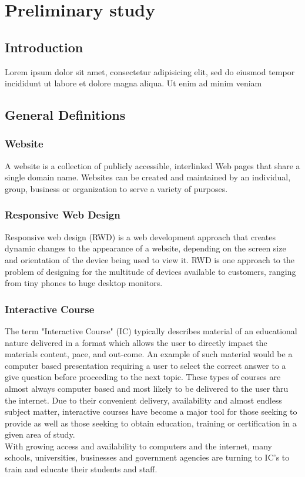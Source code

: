 \chapter{Preliminary study}

\section{Introduction}
Lorem ipsum dolor sit amet, consectetur adipisicing elit, sed do eiusmod
tempor incididunt ut labore et dolore magna aliqua. Ut enim ad minim veniam


\section{General Definitions}
\subsection{Website}
A website is a collection of publicly accessible, interlinked Web pages that share 
a single domain name. Websites can be created and maintained by an individual, group, 
business or organization to serve a variety of purposes.\cite{Techopedia2011-zo}

\subsection{Responsive Web Design}
Responsive web design (RWD) is a web development approach that creates dynamic 
changes to the appearance of a website, depending on the screen size and orientation of 
the device being used to view it. RWD is one approach to the problem of designing for 
the multitude of devices available to customers, ranging from tiny phones to huge desktop monitors.\cite{noauthor_undated-an}

\subsection{Interactive Course}
The term "Interactive Course" (IC) typically describes material of an educational nature 
delivered in a format which allows the user to directly impact the materials content, pace, and out-come.
An example of such material would be a computer based presentation requiring a user to select the correct 
answer to a give question before proceeding to the next topic.
These types of courses are almost always computer based and most likely to be delivered to the user thru the internet. 
Due to their convenient delivery, availability and almost endless subject matter, 
interactive courses have become a major tool for those seeking to provide as well as those seeking to obtain education, 
training or certification in a given area of study.\\
With growing access and availability to computers and the internet, many schools, universities, 
businesses and government agencies are turning to IC's to train and educate their students and staff.\cite{noauthor_undated-dt}

